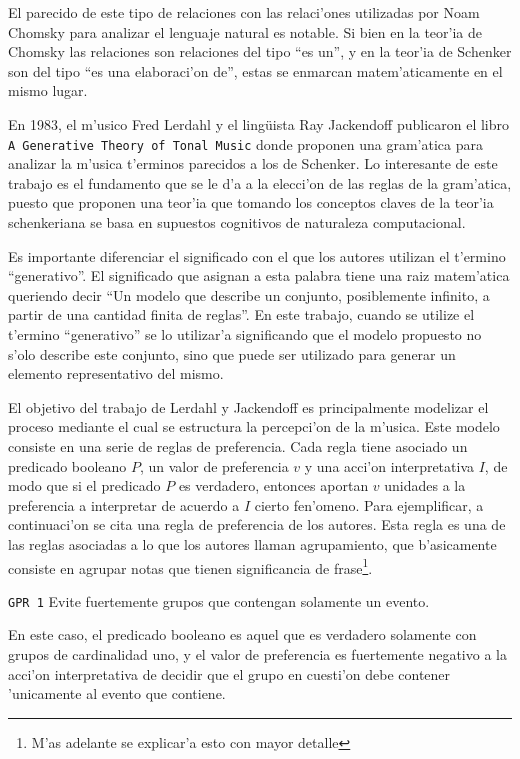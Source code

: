 El parecido de este tipo de relaciones con las relaci'ones utilizadas por Noam Chomsky para analizar el lenguaje natural es notable. 
Si bien en la teor'ia de Chomsky las relaciones son relaciones del tipo ``es un'', y en la teor'ia de Schenker son del tipo ``es una elaboraci'on de'', 
estas se enmarcan matem'aticamente en el mismo lugar.  

En 1983, el m'usico Fred Lerdahl y el ling\"uista Ray Jackendoff publicaron el libro 
\texttt{A Generative Theory of Tonal Music} donde proponen una gram'atica para analizar la m'usica t'erminos parecidos a los de Schenker. 
Lo interesante de este trabajo es el fundamento que se le d'a a la elecci'on de las reglas de la gram'atica, puesto que proponen una teor'ia que 
tomando los conceptos claves de la teor'ia schenkeriana se basa en supuestos cognitivos de naturaleza computacional. 

Es importante diferenciar el significado con el que los autores utilizan el t'ermino ``generativo''\citep[p. 6]{LerdahlJackendoff83}. El significado que asignan 
a esta palabra tiene una raiz matem'atica queriendo decir ``Un modelo que describe un conjunto, posiblemente infinito, a partir
de una cantidad finita de reglas''. En este trabajo, cuando se utilize el t'ermino ``generativo'' se lo utilizar'a significando que el modelo propuesto
no s'olo describe este conjunto, sino que puede ser utilizado para generar un elemento representativo del mismo.

El objetivo del trabajo de Lerdahl y Jackendoff es principalmente modelizar el proceso mediante el cual se estructura la percepci'on de la m'usica. 
Este modelo consiste en una serie de reglas de preferencia. Cada regla tiene asociado un predicado booleano $P$, un valor de preferencia $v$ y una acci'on interpretativa 
$I$, de modo que si el predicado $P$ es verdadero, entonces aportan $v$ unidades a la preferencia a interpretar de acuerdo a $I$ cierto fen'omeno. 
Para ejemplificar, a continuaci'on se cita una regla de preferencia de los autores. Esta regla es una de las reglas asociadas a lo que los autores 
llaman agrupamiento, que b'asicamente consiste en agrupar notas que tienen significancia de frase\footnote{M'as adelante se explicar'a esto con mayor detalle}.

\begin{center}
\texttt{GPR 1} Evite fuertemente grupos que contengan solamente un evento.
\end{center}

En este caso, el predicado booleano es aquel que es verdadero solamente con grupos de cardinalidad uno, y el valor de preferencia es fuertemente 
negativo a la acci'on interpretativa de decidir que el grupo en cuesti'on debe contener 'unicamente al evento que contiene. 

